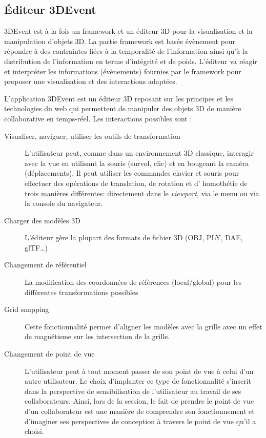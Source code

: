 \subsection{Éditeur 3DEvent}
3DEvent est à la fois un \gls{framework} et un éditeur 3D pour la visualisation et la 
manipulation d'objets 3D. La partie \gls{framework} est basée évènement pour 
répondre à des contraintes liées à la temporalité de l'information 
ainsi qu'à la distribution de l'information en terme d'intégrité et de poids. L'éditeur 
va réagir et interpréter les informations (évènements) fournies par le 
\gls{framework} pour proposer une visualisation et des interactions adaptées.

 L'application 3DEvent est un 
éditeur 3D reposant sur les principes et les technologies du web qui permettent de 
manipuler des objets 3D de manière 
collaborative en temps-réel. Les interactions possibles sont : 
\begin{description}
	
	\item[Visualiser, naviguer, utiliser les outils de transformation] L'utilisateur peut, 
	com\-me dans un environnement 3D classique, interagir avec la vue en utilisant 
	la souris (survol, clic) et en bougeant la caméra (déplacements). Il peut 
	utiliser les commandes clavier et souris pour effectuer des opérations de 
	translation, de rotation et d' homothétie de trois manières différentes: directement dans le \textit{viewport}, via le 
	menu ou via la console du navigateur.
	\item[Charger des modèles 3D] L'éditeur gère la plupart des formats de fichier 
	3D (OBJ, PLY, DAE, glTF\ldots)
	\item[Changement de référentiel] La modification des coordonnées de 
	réfé\-ren\-ces (local/global)  pour les différentes transformations possibles
	\item[Grid snapping] Cette fonctionnalité permet d'aligner les modèles avec la 
	grille avec un effet de magnétisme sur les intersection de la grille.
	\item[Changement de point de vue] L'utilisateur peut à tout moment passer de 
	son point de vue à celui d'un autre utilisateur. Le choix d'implanter ce type de 
	fonctionnalité s'inscrit dans la perspective de sensibilisation de l'utilisateur au 
	travail de ses collaborateurs. Ainsi, lors de la session, le fait de prendre le 
	point de vue d'un collaborateur est une manière de 
	comprendre son fonctionnement et d'imaginer ses 
	perspectives de conception à travers le point de vue qu'il a choisi.
\end{description}


